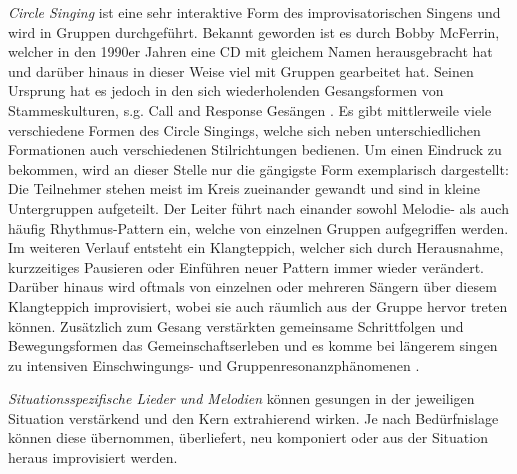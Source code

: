 \emph{Circle Singing} ist eine sehr interaktive Form des improvisatorischen Singens und wird in Gruppen durchgeführt. Bekannt geworden ist es durch Bobby McFerrin, welcher in den 1990er Jahren eine CD mit gleichem Namen herausgebracht hat und darüber hinaus in dieser Weise viel mit Gruppen gearbeitet hat. Seinen Ursprung hat es jedoch in den sich wiederholenden Gesangsformen von Stammeskulturen, s.g. Call and Response Gesängen \autocite[vgl.][280]{bossinger2006}. Es gibt mittlerweile viele verschiedene Formen des Circle Singings, welche sich neben unterschiedlichen Formationen auch verschiedenen Stilrichtungen bedienen. Um einen Eindruck zu bekommen, wird an dieser Stelle nur die gängigste Form exemplarisch dargestellt: Die Teilnehmer stehen meist im Kreis zueinander gewandt und sind in kleine Untergruppen aufgeteilt. Der Leiter führt nach einander sowohl Melodie- als auch häufig Rhythmus-Pattern ein, welche von einzelnen Gruppen aufgegriffen werden. Im weiteren Verlauf entsteht ein Klangteppich, welcher sich durch Herausnahme, kurzzeitiges Pausieren oder Einführen neuer Pattern immer wieder verändert. Darüber hinaus wird oftmals von einzelnen oder mehreren Sängern über diesem Klangteppich improvisiert, wobei sie auch räumlich aus der Gruppe hervor treten können. Zusätzlich zum Gesang verstärkten gemeinsame Schrittfolgen und Bewegungsformen das Gemeinschaftserleben und es komme bei längerem singen zu intensiven Einschwingungs- und Gruppenresonanzphänomenen \autocite[vgl.][281]{bossinger2006}.

\emph{Situationsspezifische Lieder und Melodien} können gesungen in der jeweiligen Situation verstärkend und den Kern extrahierend wirken. Je nach Bedürfnislage können diese übernommen, überliefert, neu komponiert oder aus der Situation heraus improvisiert werden.

